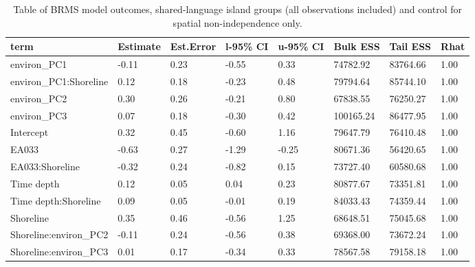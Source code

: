 \begin{table}[ht]
\centering
\begin{tabular}{p{3cm}p{1.35cm}p{1.35cm}p{1.35cm}p{1.35cm}p{1.35cm}p{1.35cm}p{1.35cm}}
  \toprule
term & Estimate & Est.Error & l-95\% CI & u-95\% CI & Bulk ESS & Tail ESS & Rhat \\ 
  \midrule
environ\_PC1 & -0.11 & 0.23 & -0.55 & 0.33 & 74782.92 & 83764.66 & 1.00 \\ 
  environ\_PC1:Shoreline & 0.12 & 0.18 & -0.23 & 0.48 & 79794.64 & 85744.10 & 1.00 \\ 
  environ\_PC2 & 0.30 & 0.26 & -0.21 & 0.80 & 67838.55 & 76250.27 & 1.00 \\ 
  environ\_PC3 & 0.07 & 0.18 & -0.30 & 0.42 & 100165.24 & 86477.95 & 1.00 \\ 
  Intercept & 0.32 & 0.45 & -0.60 & 1.16 & 79647.79 & 76410.48 & 1.00 \\ 
  EA033 & -0.63 & 0.27 & -1.29 & -0.25 & 80671.36 & 56420.65 & 1.00 \\ 
  EA033:Shoreline & -0.32 & 0.24 & -0.82 & 0.15 & 73727.40 & 60580.68 & 1.00 \\ 
  Time depth & 0.12 & 0.05 & 0.04 & 0.23 & 80877.67 & 73351.81 & 1.00 \\ 
  Time depth:Shoreline & 0.09 & 0.05 & -0.01 & 0.19 & 84033.43 & 74359.44 & 1.00 \\ 
  Shoreline & 0.35 & 0.46 & -0.56 & 1.25 & 68648.51 & 75045.68 & 1.00 \\ 
  Shoreline:environ\_PC2 & -0.11 & 0.24 & -0.56 & 0.38 & 69368.00 & 73672.24 & 1.00 \\ 
  Shoreline:environ\_PC3 & 0.01 & 0.17 & -0.34 & 0.33 & 78567.58 & 79158.18 & 1.00 \\ 
   \bottomrule
\end{tabular}
\caption{Table of BRMS model outcomes, shared-language island groups (all observations included) and control for spatial non-independence only.} 
\label{BRMS_effects_medium_control_spatial}
\end{table}
